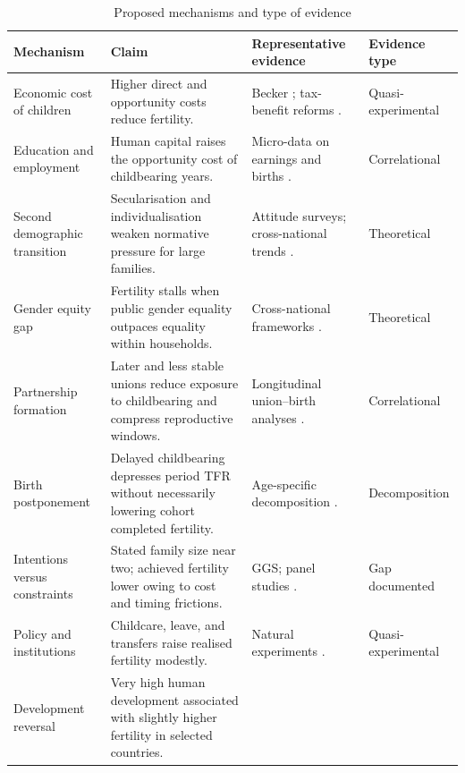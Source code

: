 \documentclass[11pt,a4paper,openany]{book}
\begin{document}
\begin{table}[htbp]
  \centering
  \caption{Proposed mechanisms and type of evidence}
  \label{tab:mechanisms}
  \small
  \begin{tabularx}{\textwidth}{@{}L{2.4cm} Y L{3.0cm} L{2.6cm}@{}}
    \toprule
    \textbf{Mechanism} &
    \textbf{Claim} &
    \textbf{Representative evidence} &
    \textbf{Evidence type} \\
    \midrule
    Economic cost of children &
    Higher direct and opportunity costs reduce fertility. &
    Becker \citep{becker1960}; tax-benefit reforms \citep{milligan2005,cohen2013}. &
    Quasi-experimental \\[4pt]
    Education and employment &
    Human capital raises the opportunity cost of childbearing years. &
    Micro-data on earnings and births \citep{rindfuss1996,adsera2011}. &
    Correlational \\[4pt]
    Second demographic transition &
    Secularisation and individualisation weaken normative pressure for large families. &
    Attitude surveys; cross-national trends \citep{lesthaeghe2010}. &
    Theoretical \\[4pt]
    Gender equity gap &
    Fertility stalls when public gender equality outpaces equality within households. &
    Cross-national frameworks \citep{mcdonald2000,goldscheider2015}. &
    Theoretical \\[4pt]
    Partnership formation &
    Later and less stable unions reduce exposure to childbearing and compress reproductive windows. &
    Longitudinal union--birth analyses \citep{perelliharris2012,perelliharris2012pd}. &
    Correlational \\[4pt]
    Birth postponement &
    Delayed childbearing depresses period TFR without necessarily lowering cohort completed fertility. &
    Age-specific decomposition \citep{bongaarts1998,sobotka2017}. &
    Decomposition \\[4pt]
    Intentions versus constraints &
    Stated family size near two; achieved fertility lower owing to cost and timing frictions. &
    GGS; panel studies \citep{sobotka2017,beaujouan2019,bujard2025}. &
    Gap documented \\[4pt]
    Policy and institutions &
    Childcare, leave, and transfers raise realised fertility modestly. &
    Natural experiments \citep{milligan2005,azmat2010,stichnoth2015}. &
    Quasi-experimental \\[4pt]
    Development reversal &
    Very high human development associated with slightly higher fertility in selected countries. &

\end{tabularx}
\end{table}
\end{document}

